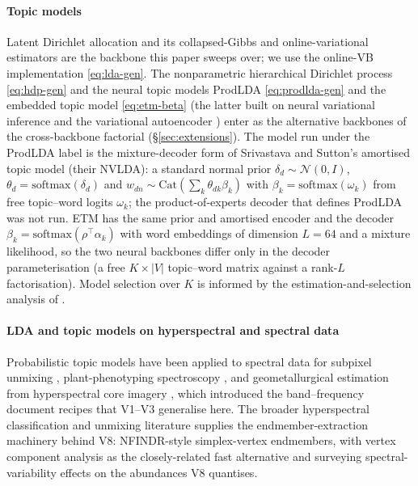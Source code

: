 \documentclass[journal,a4paper,10pt]{IEEEtran}
\begin{document}
\paragraph{Topic models} Latent Dirichlet allocation
\cite{blei2003lda} and its collapsed-Gibbs \cite{griffiths2004finding}
and online-variational \cite{hoffman2010online} estimators are the
backbone this paper sweeps over; we use the online-VB implementation
\eqref{eq:lda-gen}. The nonparametric hierarchical Dirichlet process
\cite{teh2006hdp} \eqref{eq:hdp-gen} and the neural topic models
ProdLDA \cite{srivastava2017autoencoding} \eqref{eq:prodlda-gen} and
the embedded topic model \cite{dieng2020topic} \eqref{eq:etm-beta}
(the latter built on neural variational inference \cite{miao2016neural}
and the variational autoencoder \cite{kingma2014auto}) enter as the
alternative backbones of the cross-backbone factorial
(\S\ref{sec:extensions}). The model run under the ProdLDA label is the
mixture-decoder form of Srivastava and Sutton's amortised topic model
(their NVLDA): a standard normal prior $\delta_d \sim \mathcal{N}(0, I)$,
$\theta_d = \mathrm{softmax}(\delta_d)$ and
$w_{dn} \sim \mathrm{Cat}(\sum_k \theta_{dk} \beta_k)$ with
$\beta_k = \mathrm{softmax}(\omega_k)$ from free topic--word logits
$\omega_k$; the product-of-experts decoder that
defines ProdLDA was not run. ETM has the same prior and amortised encoder
and the decoder $\beta_k = \mathrm{softmax}(\rho^{\top}\alpha_k)$ with word
embeddings of dimension $L = 64$ and a mixture likelihood, so the two
neural backbones differ only in the decoder parameterisation (a free
$K \times |V|$ topic--word matrix against a rank-$L$ factorisation).
Model selection over $K$ is informed by the
estimation-and-selection analysis of \cite{taddy2012estimation}.

\paragraph{LDA and topic models on hyperspectral and spectral data}
Probabilistic topic models have been applied to spectral data for
subpixel unmixing \cite{zou2017pmlda}, plant-phenotyping spectroscopy
\cite{wahabzada2015plant}, and geometallurgical estimation from
hyperspectral core imagery \cite{santibanezleal2022procemin}, which
introduced the band--frequency document recipes that V1--V3 generalise
here. The broader hyperspectral classification and unmixing literature
\cite{plaza2009recent,camps2014advances,bioucasdias2012unmixing}
supplies the endmember-extraction machinery behind V8: NFINDR-style
simplex-vertex endmembers, with vertex component analysis
\cite{nascimento2005vca} as the closely-related fast alternative and
\cite{borsoi2021variability} surveying spectral-variability effects on
the abundances V8 quantises.
\end{document}
